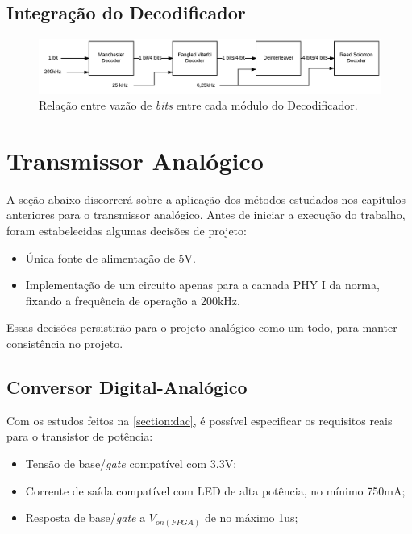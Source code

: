 	\subsection{Integração do Decodificador}

	\begin{figure}[h]
		\caption{\label{figure:integration-decoder}Relação entre vazão de \textit{bits} entre cada módulo do Decodificador.}
		\centering
		\includegraphics[width=1\textwidth]{integration/speeds-decoder.pdf}
	\end{figure}

	\section{Transmissor Analógico}
	A seção abaixo discorrerá sobre a aplicação dos métodos estudados nos capítulos anteriores para o transmissor analógico.
	Antes de iniciar a execução do trabalho, foram estabelecidas algumas decisões de projeto:
	
	\begin{itemize}
		\item Única fonte de alimentação de 5V.
		\item Implementação de um circuito apenas para a camada PHY I da norma, fixando a frequência de operação a 200kHz.
	\end{itemize}
	
	Essas decisões persistirão para o projeto analógico como um todo, para manter consistência no projeto.
	
	\subsection{Conversor Digital-Analógico}
	Com os estudos feitos na \autoref{section:dac}, é possível especificar os requisitos reais para o transistor de potência:

	\begin{itemize}
		\item Tensão de base/\textit{gate} compatível com 3.3V;
		\item Corrente de saída compatível com LED de alta potência, no mínimo 750mA;
		\item Resposta de base/\textit{gate} a $V_{on(FPGA)}$ de no máximo 1us;
	\end{itemize}
	
